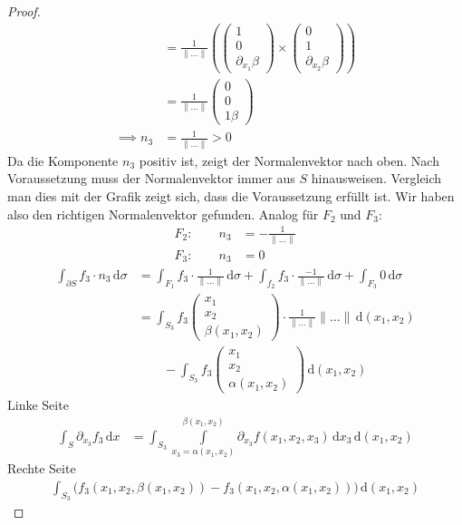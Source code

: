 \documentclass[a4paper,10pt]{scrbook}
\begin{document}
\begin{theorem}
\begin{proof}
\begin{align*}
      &= \frac{1}{\|\ldots\|} \left( \begin{pmatrix} 1 \\ 0 \\ \partial_{x_1} \beta \end{pmatrix} \times  \begin{pmatrix} 0 \\ 1 \\ \partial_{x_2} \beta \end{pmatrix} \right) \\
      &= \frac{1}{\|\ldots\|} \begin{pmatrix} 0 \\ 0 \\ 1 \beta \end{pmatrix} \\
      \implies n_3 &= \frac{1}{\|\ldots\|} > 0
    \end{align*}
    Da die Komponente $n_3$ positiv ist, zeigt der Normalenvektor nach oben. Nach Voraussetzung muss der Normalenvektor immer aus $S$ hinausweisen. Vergleich man dies mit der Grafik zeigt sich, dass die Voraussetzung erfüllt ist. Wir haben also den richtigen Normalenvektor gefunden. Analog für $F_2$ und $F_3$:
    \begin{align*}
      F_2: \qquad n_3 &= - \frac{1}{\|\ldots\|} \\
      F_3: \qquad n_3 &= 0
    \end{align*}
    \begin{align*}
      \int_{\partial S} f_3 \cdot n_3 \, \mathrm{d}\sigma
      &= \int_{F_1} f_3 \cdot \frac{1}{\|\ldots\|} \, \mathrm{d}\sigma + \int_{f_2} f_3 \cdot \frac{-1}{\|\ldots\|} \, \mathrm{d}\sigma + \int_{F_3} 0 \, \mathrm{d}\sigma \\
      &= \int_{S_3} f_3 \begin{pmatrix} x_1 \\ x_2 \\ \beta(x_1,x_2) \end{pmatrix} \cdot \frac{1}{\|\ldots\|} \|\ldots\| \, \mathrm{d}(x_1,x_2) \\
      &\qquad - \int_{S_3} f_3 \begin{pmatrix} x_1 \\ x_2 \\ \alpha(x_1,x_2) \end{pmatrix} \, \mathrm{d}(x_1,x_2)
    \end{align*}
    Linke Seite
    \begin{align*}
      \int_S \partial_{x_3} f_3 \, \mathrm{d}x
      &= \int_{S_3} \int\limits_{x_3 = \alpha(x_1,x_2)}^{\beta(x_1,x_2)} \partial_{x_3} f(x_1,x_2,x_3) \, \mathrm{d}x_3 \, \mathrm{d}(x_1,x_2)
    \end{align*}
    Rechte Seite
    \begin{align*}
      \int_{S_3} \Big( f_3(x_1,x_2,\beta(x_1,x_2)) - f_3(x_1,x_2,\alpha(x_1,x_2)) \Big) \, \mathrm{d}(x_1,x_2)
    \end{align*}
  \end{proof}
\end{theorem}
\end{document}
